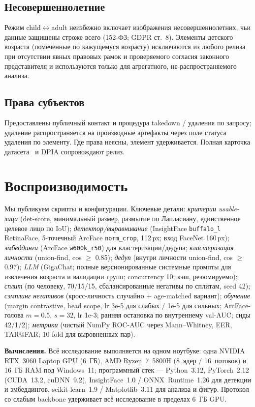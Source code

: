 \documentclass[journal]{IEEEtran}
\begin{document}
\subsection{Несовершеннолетние}\label{sec:eth-minors}
Режим child$\leftrightarrow$adult неизбежно включает изображения несовершеннолетних, чьи данные защищены строже всего (152-ФЗ; GDPR ст.~8). Элементы детского возраста (помеченные по кажущемуся возрасту) исключаются из любого релиза при отсутствии явных правовых рамок и проверяемого согласия законного представителя и используются только для агрегатного, не-распространяемого анализа.

\subsection{Права субъектов}\label{sec:eth-rights}
Предоставлены публичный контакт и процедура takedown / удаления по запросу; удаление распространяется на производные артефакты через поле статуса удаления по элементу. Где права неясны, элемент удерживается. Полная карточка датасета~\cite{gebru2021datasheets} и DPIA сопровождают релиз.

\section{Воспроизводимость}\label{sec:repro}
Мы публикуем скрипты и конфигурации. Ключевые детали: \emph{критерии usable-лица} (det-score, минимальный размер, размытие по Лапласиану, единственное целевое лицо по IoU); \emph{детектор/выравнивание} (InsightFace \texttt{buffalo\_l} RetinaFace, 5-точечный ArcFace \texttt{norm\_crop}, 112\,px; вход FaceNet 160\,px); \emph{эмбеддинги} (ArcFace \texttt{w600k\_r50}) для кластеризации/дедупа; \emph{кластеризация личности} (union-find, cos $\geq$ 0.85); \emph{дедуп} (внутри личности union-find, cos $\geq$ 0.97); \emph{LLM} (GigaChat; полные версионированные системные промпты для извлечения возраста и валидации групп; concurrency 10; кэш, резюмируемо); \emph{сплит} (по человеку, 70/15/15, сбалансированные негативы по сплитам, seed 42); \emph{сэмплинг негативов} (кросс-личность случайно $+$ age-matched вариант); \emph{обучение} (margin contrastive, head scope, lr 3e-5 для слабых / 1e-5 для сильных; ArcFace-голова $m{=}0.5$, $s{=}32$, lr 1e-3; ранняя остановка по внутреннему val-AUC; сиды 42/1/2); \emph{метрики} (чистый NumPy ROC-AUC через Mann--Whitney, EER, TAR@FAR; 10-fold для выровненных пар).

\textbf{Вычисления.} Всё исследование выполняется на одном ноутбуке: одна NVIDIA RTX~3060 Laptop GPU (6~ГБ), AMD Ryzen~7~5800H (8~ядер / 16~потоков) и 16~ГБ RAM под Windows~11; программный стек --- Python~3.12, PyTorch~2.12 (CUDA~13.2, cuDNN~9.2), InsightFace~1.0 / ONNX~Runtime~1.26 для детекции и эмбеддингов, scikit-learn~1.9 / Matplotlib~3.11 для анализа и фигур. Протокол со слабым backbone удерживает всё исследование в пределах 6~ГБ GPU.
\end{document}
